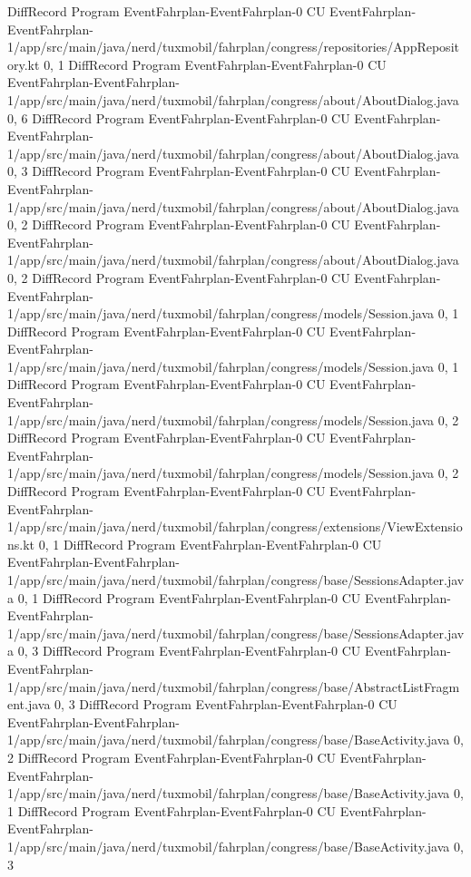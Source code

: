 DiffRecord Program EventFahrplan-EventFahrplan-0 CU EventFahrplan-EventFahrplan-1/app/src/main/java/nerd/tuxmobil/fahrplan/congress/repositories/AppRepository.kt  {0, 1}
DiffRecord Program EventFahrplan-EventFahrplan-0 CU EventFahrplan-EventFahrplan-1/app/src/main/java/nerd/tuxmobil/fahrplan/congress/about/AboutDialog.java  {0, 6}
DiffRecord Program EventFahrplan-EventFahrplan-0 CU EventFahrplan-EventFahrplan-1/app/src/main/java/nerd/tuxmobil/fahrplan/congress/about/AboutDialog.java  {0, 3}
DiffRecord Program EventFahrplan-EventFahrplan-0 CU EventFahrplan-EventFahrplan-1/app/src/main/java/nerd/tuxmobil/fahrplan/congress/about/AboutDialog.java  {0, 2}
DiffRecord Program EventFahrplan-EventFahrplan-0 CU EventFahrplan-EventFahrplan-1/app/src/main/java/nerd/tuxmobil/fahrplan/congress/about/AboutDialog.java  {0, 2}
DiffRecord Program EventFahrplan-EventFahrplan-0 CU EventFahrplan-EventFahrplan-1/app/src/main/java/nerd/tuxmobil/fahrplan/congress/models/Session.java  {0, 1}
DiffRecord Program EventFahrplan-EventFahrplan-0 CU EventFahrplan-EventFahrplan-1/app/src/main/java/nerd/tuxmobil/fahrplan/congress/models/Session.java  {0, 1}
DiffRecord Program EventFahrplan-EventFahrplan-0 CU EventFahrplan-EventFahrplan-1/app/src/main/java/nerd/tuxmobil/fahrplan/congress/models/Session.java  {0, 2}
DiffRecord Program EventFahrplan-EventFahrplan-0 CU EventFahrplan-EventFahrplan-1/app/src/main/java/nerd/tuxmobil/fahrplan/congress/models/Session.java  {0, 2}
DiffRecord Program EventFahrplan-EventFahrplan-0 CU EventFahrplan-EventFahrplan-1/app/src/main/java/nerd/tuxmobil/fahrplan/congress/extensions/ViewExtensions.kt  {0, 1}
DiffRecord Program EventFahrplan-EventFahrplan-0 CU EventFahrplan-EventFahrplan-1/app/src/main/java/nerd/tuxmobil/fahrplan/congress/base/SessionsAdapter.java  {0, 1}
DiffRecord Program EventFahrplan-EventFahrplan-0 CU EventFahrplan-EventFahrplan-1/app/src/main/java/nerd/tuxmobil/fahrplan/congress/base/SessionsAdapter.java  {0, 3}
DiffRecord Program EventFahrplan-EventFahrplan-0 CU EventFahrplan-EventFahrplan-1/app/src/main/java/nerd/tuxmobil/fahrplan/congress/base/AbstractListFragment.java  {0, 3}
DiffRecord Program EventFahrplan-EventFahrplan-0 CU EventFahrplan-EventFahrplan-1/app/src/main/java/nerd/tuxmobil/fahrplan/congress/base/BaseActivity.java  {0, 2}
DiffRecord Program EventFahrplan-EventFahrplan-0 CU EventFahrplan-EventFahrplan-1/app/src/main/java/nerd/tuxmobil/fahrplan/congress/base/BaseActivity.java  {0, 1}
DiffRecord Program EventFahrplan-EventFahrplan-0 CU EventFahrplan-EventFahrplan-1/app/src/main/java/nerd/tuxmobil/fahrplan/congress/base/BaseActivity.java  {0, 3}
